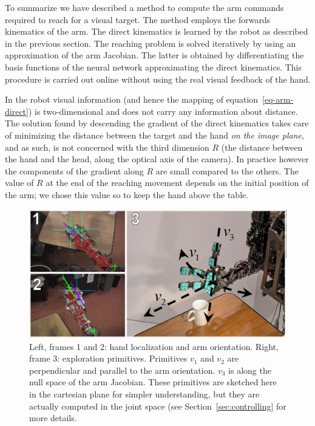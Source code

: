 To summarize we have described a method to compute the arm
commands required to reach for a visual target. The method employs
the forwards kinematics of the arm. The direct kinematics is
learned by the robot as described in the previous section. The
reaching problem is solved iteratively by using an approximation
of the arm Jacobian. The latter is obtained by differentiating the
basis functions of the neural network approximating the direct
kinematics. This procedure is carried out online without using the
real visual feedback of the hand.

In the robot visual information (and hence the mapping of 
equation~\ref{eq-arm-direct})
is two-dimensional and does not carry any information
about distance. The solution found by descending the gradient of the
direct kinematics takes care of minimizing the distance between the target
and the hand \emph{on the image plane}, and as such, is not concerned
with the third dimension $R$ (the distance between the hand and the head, 
along the optical axis of the camera).
In practice however the components of the gradient along $R$ are small
compared to the others. The value of $R$ at the end of the reaching movement
depends on the initial position of the arm; we chose this value so to keep
the hand above the table.
%
\begin{figure}[tb]
  \centerline{
    \includegraphics[width=\columnwidth, angle=0 ]{./figures/expl-directions.eps}
  }\caption{Left, frames 1 and 2: hand localization and arm
    orientation. Right, frame 3: exploration primitives. Primitives $v_1$
and $v_2$ are perpendicular and parallel to the arm orientation.
$v_3$ is along the null space of the arm Jacobian. These primitives
are sketched here in the cartesian plane for simpler understanding, but 
they are actually computed in the joint space (see 
Section~\ref{sec:controlling} for more details.}
\label{fig:expl-directions}
\end{figure}
%
